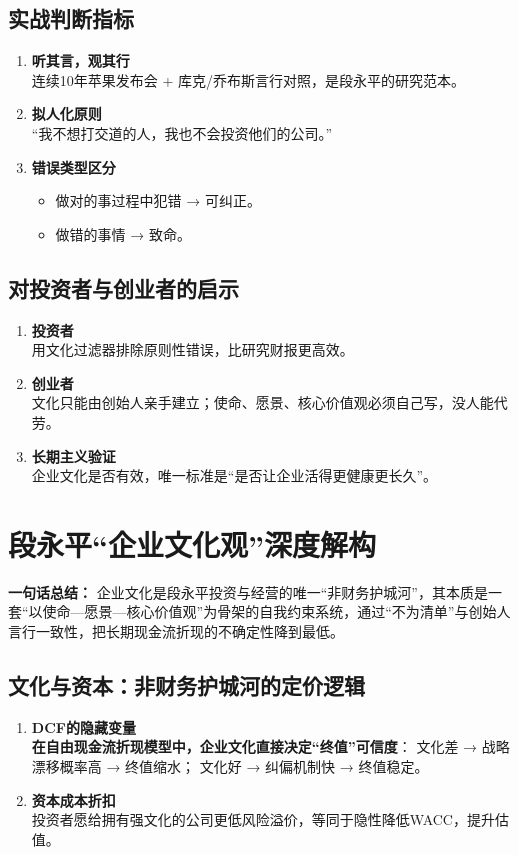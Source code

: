 \subsection{实战判断指标}
\begin{enumerate}[leftmargin=*, nosep]
    \item \textbf{听其言，观其行}  \\
    {\color{red}连续10年苹果发布会 + 库克/乔布斯言行对照，是段永平的研究范本}。
    \item \textbf{拟人化原则}  \\
    “我不想打交道的人，我也不会投资他们的公司。”
    \item \textbf{错误类型区分}  
    \begin{itemize}[nosep]
        \item 做对的事过程中犯错 → 可纠正。  
        \item 做错的事情 → 致命。
    \end{itemize}
\end{enumerate}

\subsection{对投资者与创业者的启示}
\begin{enumerate}[leftmargin=*, nosep]
    \item \textbf{投资者}  \\
    用文化过滤器排除原则性错误，比研究财报更高效。
    \item \textbf{创业者}  \\
    文化只能由创始人亲手建立；使命、愿景、核心价值观必须自己写，没人能代劳。
    \item \textbf{长期主义验证}  \\
    企业文化是否有效，唯一标准是“是否让企业活得更健康更长久”。
\end{enumerate}


\section{段永平“企业文化观”深度解构}
\textbf{一句话总结：}  
企业文化是段永平投资与经营的唯一“非财务护城河”，其本质是一套“以使命—愿景—核心价值观”为骨架的自我约束系统，通过“不为清单”与创始人言行一致性，把长期现金流折现的不确定性降到最低。

\subsection{文化与资本：非财务护城河的定价逻辑}
\begin{enumerate}[leftmargin=*, nosep]
    \item \textbf{DCF的隐藏变量}  \\
    {\color{red}\textbf{在自由现金流折现模型中，企业文化直接决定“终值”可信度}}：  
    文化差 → 战略漂移概率高 → 终值缩水；  
    文化好 → 纠偏机制快 → 终值稳定。
    \item \textbf{资本成本折扣}  \\
    投资者愿给拥有强文化的公司更低风险溢价，等同于隐性降低WACC，提升估值。
\end{enumerate}

